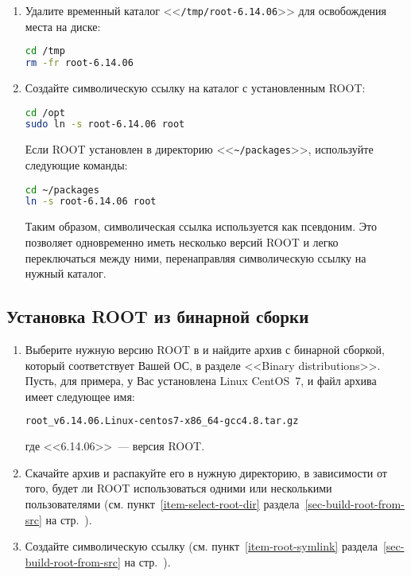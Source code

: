 \documentclass[12pt, a4paper, oneside, onecolumn]{book}
\newcommand{\ROOT}{\mbox{ROOT}}
\newcommand{\DIRECTORY}[1]{<<{\tt #1}>>}
\begin{document}
\begin{enumerate}
\item Удалите временный каталог \DIRECTORY{/tmp/root-6.14.06} для освобождения места на диске:

\begin{lstlisting}[language=bash]
cd /tmp
rm -fr root-6.14.06
\end{lstlisting}

\item Создайте символическую ссылку на каталог с установленным \ROOT{}:
\label{item-root-symlink}

\begin{lstlisting}[language=bash]
cd /opt
sudo ln -s root-6.14.06 root
\end{lstlisting}

Если \ROOT{} установлен в директорию \DIRECTORY{\~{}/packages}, используйте следующие команды:

\begin{lstlisting}[language=bash]
cd ~/packages
ln -s root-6.14.06 root
\end{lstlisting}

Таким образом, символическая ссылка используется как псевдоним. Это позволяет одновременно иметь несколько версий \ROOT{} и легко переключаться между ними, перенаправляя символическую ссылку на нужный каталог.

\end{enumerate}

\subsection{Установка \ROOT{} из бинарной сборки}

\begin{enumerate}

\item Выберите нужную версию \ROOT{} в \cite{RootDownload} и найдите архив с бинарной сборкой, который соответствует Вашей ОС, в разделе <<Binary distributions>>. Пусть, для примера, у Вас установлена Linux CentOS~7, и файл архива имеет следующее имя:

\begin{lstlisting}[language=bash]
root_v6.14.06.Linux-centos7-x86_64-gcc4.8.tar.gz
\end{lstlisting}
 
\noindent где <<6.14.06>>~--- версия \ROOT{}.

\item Скачайте архив и распакуйте его в нужную директорию, в зависимости от того, будет ли \ROOT{} использоваться одними или несколькими пользователями (см. пункт~\ref{item-select-root-dir} раздела~\ref{sec-build-root-from-src} на стр.~\pageref{item-select-root-dir}).

\item Создайте символическую ссылку (см. пункт~\ref{item-root-symlink} раздела~\ref{sec-build-root-from-src} на стр.~\pageref{item-root-symlink}).
\end{enumerate}
\end{document}
